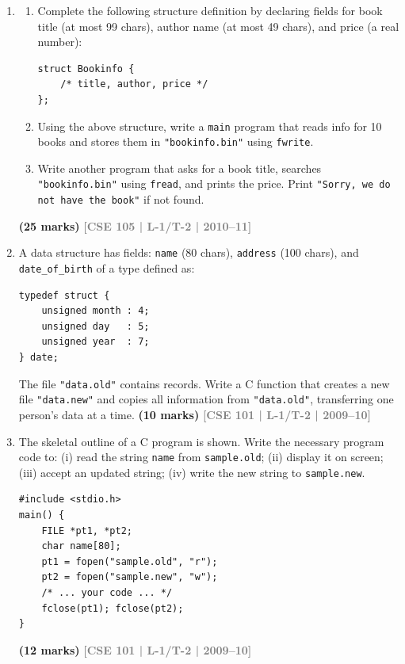 \documentclass[12pt,a3paper]{article}
\newcommand{\yr}[1]{\hfill\textcolor{gray}{\small\textbf{[#1]}}}
\newcommand{\mk}[1]{\textcolor{orange!70!black}{\small\textbf{(#1 marks)}}}
\begin{document}
\begin{enumerate}
\item
\begin{enumerate}
  \item Complete the following structure definition by declaring fields for book title (at most 99 chars), author name (at most 49 chars), and price (a real number):
\begin{lstlisting}
struct Bookinfo {
    /* title, author, price */
};
\end{lstlisting}
  \item Using the above structure, write a \texttt{main} program that reads info for 10 books and stores them in \texttt{"bookinfo.bin"} using \texttt{fwrite}.
  \item Write another program that asks for a book title, searches \texttt{"bookinfo.bin"} using \texttt{fread}, and prints the price. Print \texttt{"Sorry, we do not have the book"} if not found.
\end{enumerate}
\mk{25} \yr{CSE 105 | L-1/T-2 | 2010--11}

\item A data structure has fields: \texttt{name} (80 chars), \texttt{address} (100 chars), and \texttt{date\_of\_birth} of a type defined as:
\begin{lstlisting}
typedef struct {
    unsigned month : 4;
    unsigned day   : 5;
    unsigned year  : 7;
} date;
\end{lstlisting}
The file \texttt{"data.old"} contains records. Write a C function that creates a new file \texttt{"data.new"} and copies all information from \texttt{"data.old"}, transferring one person's data at a time.
\mk{10} \yr{CSE 101 | L-1/T-2 | 2009--10}

\item The skeletal outline of a C program is shown. Write the necessary program code to: (i) read the string \texttt{name} from \texttt{sample.old}; (ii) display it on screen; (iii) accept an updated string; (iv) write the new string to \texttt{sample.new}.
 
\begin{lstlisting}
#include <stdio.h>
main() {
    FILE *pt1, *pt2;
    char name[80];
    pt1 = fopen("sample.old", "r");
    pt2 = fopen("sample.new", "w");
    /* ... your code ... */
    fclose(pt1); fclose(pt2);
}
\end{lstlisting}
\mk{12} \yr{CSE 101 | L-1/T-2 | 2009--10}




\end{enumerate}
\end{document}
